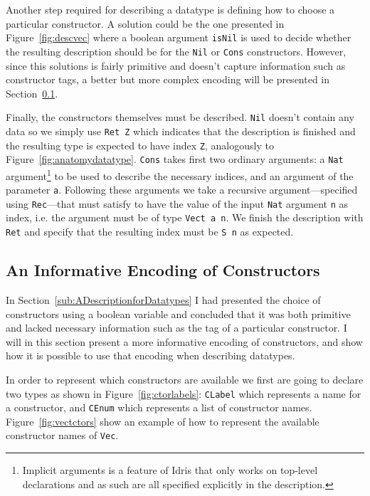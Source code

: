 \documentclass{ituthesis}
\begin{document}
Another step required for describing a datatype is defining how to choose a particular constructor.
A solution could be the one presented in Figure~\ref{fig:descvec} where a boolean argument \texttt{isNil} is used to decide whether the resulting description should be for the \texttt{Nil} or \texttt{Cons} constructors.
However, since this solutions is fairly primitive and doesn't capture information such as constructor tags, a better but more complex encoding will be presented in Section~\ref{sub:AnInformativeEncodingofConstructors}.

Finally, the constructors themselves must be described.
\texttt{Nil} doesn't contain any data so we simply use \texttt{Ret Z} which indicates that the description is finished and the resulting type is expected to have index \texttt{Z}, analogously to Figure~\ref{fig:anatomydatatype}.
\texttt{Cons} takes first two ordinary arguments: a \texttt{Nat} argument\footnote{Implicit arguments is a feature of Idris that only works on top-level declarations and as such are all specified explicitly in the description.} to be used to describe the necessary indices, and an argument of the parameter \texttt{a}. Following these arguments we take a recursive argument---specified using \texttt{Rec}---that must satisfy to have the value of the input \texttt{Nat} argument \texttt{n} as index, i.e. the argument must be of type \texttt{Vect a n}. We finish the description with \texttt{Ret} and specify that the resulting index must be \texttt{S n} as expected.

\subsection{An Informative Encoding of Constructors}
\label{sub:AnInformativeEncodingofConstructors}
In Section~\ref{sub:ADescriptionforDatatypes} I had presented the choice of constructors using a boolean variable and concluded that it was both primitive and lacked
necessary information such as the tag of a particular constructor. I will in this section present a more informative encoding of constructors, and show how it is possible to use that encoding when describing datatypes.

In order to represent which constructors are available we first are going to declare two types as shown in Figure~\ref{fig:ctorlabels}: \texttt{CLabel} which represents a name for a constructor, and \texttt{CEnum} which
represents a list of constructor names. Figure~\ref{fig:vectctors} show an example of how to represent the available constructor names of \texttt{Vec}.
\end{document}
